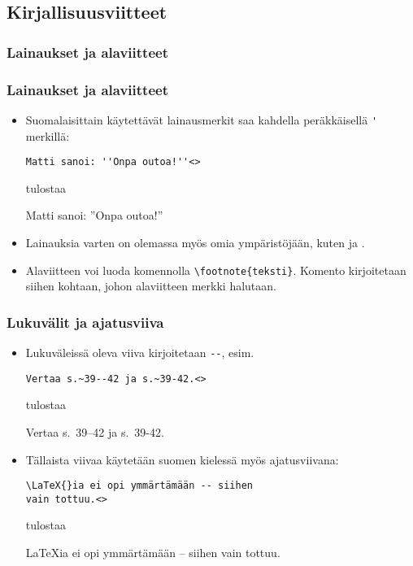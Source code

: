 \subsection{Kirjallisuusviitteet}

\subsubsection{Lainaukset ja alaviitteet}
\begin{fframe}
    \frametitle{Lainaukset ja alaviitteet}
    \begin{itemize}[<+->]
        \item Suomalaisittain käytettävät lainausmerkit saa kahdella peräkkäisellä \lstinline-'- merkillä:
            \begin{lstlisting}
Matti sanoi: ''Onpa outoa!''<>
            \end{lstlisting}
            tulostaa
            \begin{sample}
                Matti sanoi: ''Onpa outoa!''
            \end{sample}
        \item Lainauksia varten on olemassa myös omia ympäristöjään, kuten  ja .
        \item Alaviitteen voi luoda komennolla \lstinline-\footnote{teksti}-. Komento kirjoitetaan siihen kohtaan, johon alaviitteen merkki halutaan. 
    \end{itemize}
\end{fframe}

\begin{fframe}
    \frametitle{Lukuvälit ja ajatusviiva}
    \begin{itemize}[<+->]
        \item Lukuväleissä oleva viiva kirjoitetaan \lstinline|--|, esim.
            \begin{lstlisting}
Vertaa s.~39--42 ja s.~39-42.<>
            \end{lstlisting}
            tulostaa
            \begin{sample}
                Vertaa s.~39--42 ja s.~39-42.
            \end{sample}
        \item Tällaista viivaa käytetään suomen kielessä myös ajatusviivana:
            \begin{lstlisting}
\LaTeX{}ia ei opi ymmärtämään -- siihen
vain tottuu.<>
            \end{lstlisting}
            tulostaa
            \begin{sample}
                \LaTeX{}ia ei opi ymmärtämään -- siihen
                vain tottuu.
            \end{sample}
    \end{itemize}
\end{fframe}

